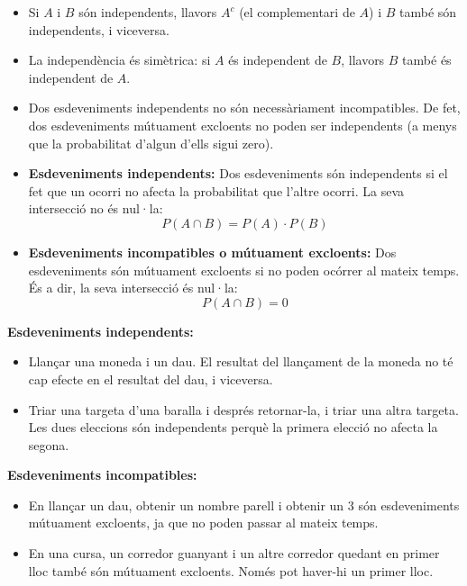 \documentclass[12pt]{article}
\begin{document}
\begin{concept} [title=Propietats dels esdeveniments independents] \noindent  
\begin{itemize}
    \item Si $A$ i $B$ són independents, llavors $A^c$ (el complementari de $A$) i $B$ també són independents, i viceversa.
    \item La independència és simètrica: si $A$ és independent de $B$, llavors $B$ també és independent de $A$.
    \item Dos esdeveniments independents no són necessàriament incompatibles. De fet, dos esdeveniments mútuament excloents no poden ser independents (a menys que la probabilitat d'algun d'ells sigui zero).
\end{itemize}
\end{concept}

\begin{concept} [title=Diferència entre esdeveniments independents i incompatibles] \noindent
\begin{itemize}
    \item \textbf{Esdeveniments independents:}  
    Dos esdeveniments són independents si el fet que un ocorri no afecta la probabilitat que l'altre ocorri. La seva intersecció no és nul·la:  
    \[
    P(A \cap B) = P(A) \cdot P(B)
    \]
    \item \textbf{Esdeveniments incompatibles o mútuament excloents:}  
    Dos esdeveniments són mútuament excloents si no poden ocórrer al mateix temps. És a dir, la seva intersecció és nul·la:  
    \[
    P(A \cap B) = 0
    \]
\end{itemize}
\end{concept}

\begin{exemple} [title=Exemples]     
\noindent
\textbf{Esdeveniments independents:}  
\begin{itemize}
    \item Llançar una moneda i un dau. El resultat del llançament de la moneda no té cap efecte en el resultat del dau, i viceversa.
    \item Triar una targeta d'una baralla i després retornar-la, i triar una altra targeta. Les dues eleccions són independents perquè la primera elecció no afecta la segona.
\end{itemize}

\textbf{Esdeveniments incompatibles:}  
\begin{itemize}
    \item En llançar un dau, obtenir un nombre parell i obtenir un 3 són esdeveniments mútuament excloents, ja que no poden passar al mateix temps.
    \item En una cursa, un corredor guanyant i un altre corredor quedant en primer lloc també són mútuament excloents. Només pot haver-hi un primer lloc.
\end{itemize}
\end{exemple}
\end{document}
